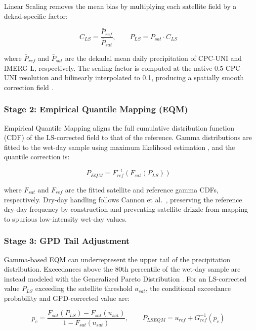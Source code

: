 \documentclass[11pt,a4paper]{article}
\begin{document}
Linear Scaling removes the mean bias by multiplying each satellite field
by a dekad-specific factor:

\begin{equation}
C_{LS} = \frac{\bar{P}_{ref}}{\bar{P}_{sat}},
\qquad
P_{LS} = P_{sat} \cdot C_{LS}
\label{eq:ls}
\end{equation}

where $\bar{P}_{ref}$ and $\bar{P}_{sat}$ are the dekadal mean daily
precipitation of CPC-UNI and IMERG-L, respectively. The scaling factor
is computed at the native 0.5\textdegree{} CPC-UNI resolution and
bilinearly interpolated to 0.1\textdegree{}, producing a spatially smooth
correction field \cite{ref23}.

\subsubsection{Stage 2: Empirical Quantile Mapping (EQM)}

Empirical Quantile Mapping aligns the full cumulative distribution
function (CDF) of the LS-corrected field to that of the reference.
Gamma distributions are fitted to the wet-day sample using maximum
likelihood estimation \cite{ref15}, and the quantile correction is:

\begin{equation}
P_{EQM} = F_{ref}^{-1}\!\left(F_{sat}(P_{LS})\right)
\label{eq:eqm}
\end{equation}

where $F_{sat}$ and $F_{ref}$ are the fitted satellite and reference
gamma CDFs, respectively. Dry-day handling follows Cannon et
al.~\cite{ref11}, preserving the reference dry-day frequency by
construction and preventing satellite drizzle from mapping to spurious
low-intensity wet-day values.

\subsubsection{Stage 3: GPD Tail Adjustment}

Gamma-based EQM can underrepresent the upper tail of the precipitation
distribution. Exceedances above the 80th percentile of the wet-day
sample are instead modeled with the Generalized Pareto Distribution
\cite{ref7}. For an LS-corrected value $P_{LS}$ exceeding the satellite
threshold $u_{sat}$, the conditional exceedance probability and
GPD-corrected value are:

\begin{equation}
p_c = \frac{F_{sat}(P_{LS}) - F_{sat}(u_{sat})}{1 - F_{sat}(u_{sat})},
\qquad
P_{LSEQM} = u_{ref} + G_{ref}^{-1}(p_c)
\label{eq:gpd}
\end{equation}
\end{document}
